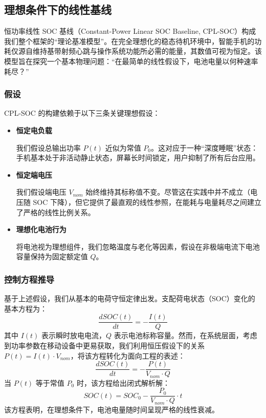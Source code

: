 \documentclass[11pt,a4paper]{ctexart}
\begin{document}
\subsection{理想条件下的线性基线}

恒功率线性 SOC 基线（Constant-Power Linear SOC Baseline, CPL-SOC）构成我们整个框架的“理论基准模型”。在完全理想化的稳态待机环境中，智能手机的功耗仅源自维持基带射频心跳与操作系统功能所必需的能量，其数值可视为恒定。该模型旨在探究一个基本物理问题：“在最简单的线性假设下，电池电量以何种速率耗尽？”

\subsubsection{假设}

CPL-SOC 的构建依赖于以下三条关键理想假设：

\begin{itemize}[leftmargin=2em]
\item \textbf{恒定电负载}

我们假设总输出功率 $P(t)$ 近似为常值 $P_0$。这对应于一种“深度睡眠”状态：手机基本处于非活动静止状态，屏幕长时间锁定，用户抑制了所有后台应用。

\item \textbf{恒定端电压}

我们假设端电压 $V_{nom}$ 始终维持其标称值不变。尽管这在实践中并不成立（电压随 SOC 下降），但它提供了最直观的线性参照，在能耗与电量耗尽之间建立了严格的线性比例关系。

\item \textbf{理想化电池行为}

将电池视为理想组件，我们忽略温度与老化等因素，假设在非极端电流下电池容量保持为固定额定值 $Q$。
\end{itemize}

\subsubsection{控制方程推导}

基于上述假设，我们从基本的电荷守恒定律出发。支配荷电状态（SOC）变化的基本方程为：
\[
\frac{dSOC(t)}{dt} = -\frac{I(t)}{Q}
\]
其中 $I(t)$ 表示瞬时放电电流，$Q$ 表示电池标称容量。然而，在系统层面，考虑到功率参数在移动设备中更易获取，我们利用恒压假设下的关系 $P(t)=I(t)\cdot V_{nom}$，将该方程转化为面向工程的表述：
\begin{equation}
\frac{dSOC(t)}{dt} = -\frac{P(t)}{V_{nom}\cdot Q}
\end{equation}
当 $P(t)$ 等于常值 $P_0$ 时，该方程给出闭式解析解：
\begin{equation}
SOC(t) = SOC_0 - \frac{P_0}{V_{nom}\cdot Q}\cdot t
\end{equation}
该方程表明，在理想条件下，电池电量随时间呈现严格的线性衰减。
\end{document}
